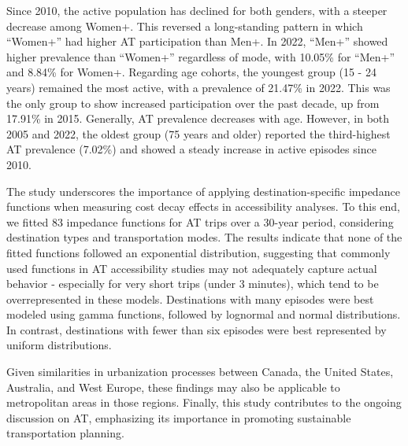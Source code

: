 \documentclass[preprint, 3p,
authoryear]{elsarticle} %
\begin{document}
Since 2010, the active population has declined for both genders, with a
steeper decrease among Women+. This reversed a long-standing pattern in
which ``Women+'' had higher AT participation than Men+. In 2022,
``Men+'' showed higher prevalence than ``Women+'' regardless of mode,
with 10.05\% for ``Men+'' and 8.84\% for Women+. Regarding age cohorts,
the youngest group (15 - 24 years) remained the most active, with a
prevalence of 21.47\% in 2022. This was the only group to show increased
participation over the past decade, up from 17.91\% in 2015. Generally,
AT prevalence decreases with age. However, in both 2005 and 2022, the
oldest group (75 years and older) reported the third-highest AT
prevalence (7.02\%) and showed a steady increase in active episodes
since 2010.

The study underscores the importance of applying destination-specific
impedance functions when measuring cost decay effects in accessibility
analyses. To this end, we fitted 83 impedance functions for AT trips
over a 30-year period, considering destination types and transportation
modes. The results indicate that none of the fitted functions followed
an exponential distribution, suggesting that commonly used functions in
AT accessibility studies may not adequately capture actual behavior -
especially for very short trips (under 3 minutes), which tend to be
overrepresented in these models. Destinations with many episodes were
best modeled using gamma functions, followed by lognormal and normal
distributions. In contrast, destinations with fewer than six episodes
were best represented by uniform distributions.

Given similarities in urbanization processes between Canada, the United
States, Australia, and West Europe, these findings may also be
applicable to metropolitan areas in those regions. Finally, this study
contributes to the ongoing discussion on AT, emphasizing its importance
in promoting sustainable transportation planning.

\renewcommand\refname{References}

\end{document}
